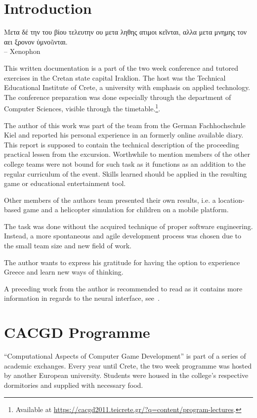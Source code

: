 \documentclass[bibtotocnumbered, headsepline,normalheadings,12pt]{report}
\newcommand{\gdir}%
   {\foreignlanguage{polutonikogreek}}
\begin{document}
\chapter{Introduction}
\label{chap:intro}
\gdir{Μετα δέ την του βίου τελευτην ου  μετα ληθης ατιμοι κεῖνται, αλλα μετα μνημης τον αει ξρονον ὑμνοũνται.}\\
-- Xenophon
\vspace{15mm}

This written documentation is a part of the two week conference and tutored exercises in the Cretan state capital Iraklion. The host was the
Technical Educational Institute of Crete, a university with emphasis on applied technology. The conference preparation was done especially through the 
department of Computer Sciences, visible through the timetable.\footnote{Available at \url{https://cacgd2011.teicrete.gr/?q=content/program-lectures}.}.

The author of this work was part of the team from the German Fachhochschule Kiel and reported his personal experience in an formerly online available
diary. This report is supposed to contain the technical description of the proceeding practical lessen from the excursion. Worthwhile to mention 
members of the other college teams were not bound for such task as it functions as an addition to the regular curriculum of the event.
Skills learned should be applied in the resulting game or educational entertainment tool.

Other members of the authors team presented their own results, i.e. a location-based game and a helicopter simulation for children on a mobile platform.

The task was done without the acquired technique of proper software engineering. Instead, a more spontaneous and agile development process was
chosen due to the small team size and new field of work.

The author wants to express his gratitude for having the option to experience Greece and learn new ways of thinking. 

A preceding work from the author is recommended to read as it contains more information in regards to the neural interface, see~\cite{pm}.


\chapter{CACGD Programme}
\label{chap:cacgd}

``Computational Aspects of Computer Game Development'' is part of a series of academic exchanges. Every year until Crete, the 
two week programme was hosted by another European university. Students were housed in the college's respective dormitories and 
supplied with necessary food.
\end{document}
